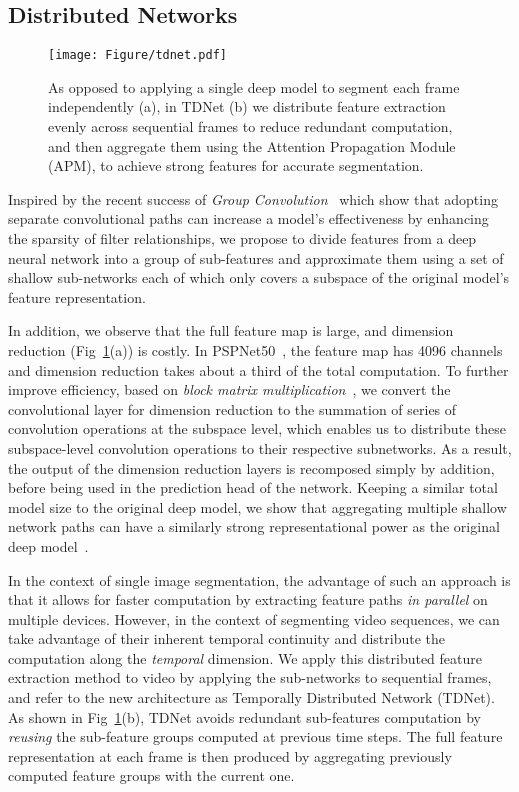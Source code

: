 \documentclass[10pt,twocolumn,letterpaper]{article}
\begin{document}
\subsection{Distributed Networks}
\label{sec_dn}

\begin{figure}
\centering
\texttt{[image: Figure/tdnet.pdf]}
\caption{As opposed to applying a single deep model to segment each frame independently (a), in TDNet (b) we distribute feature extraction evenly across sequential frames to reduce redundant computation, and then aggregate them using the Attention Propagation Module (APM), to achieve strong features for accurate segmentation.}
\label{fig2}
\vspace{-0.3cm}
\end{figure}

Inspired by the recent success of \textit{Group Convolution}~\cite{krizhevsky2012imagenet,ioannou2017deep} which show that adopting separate convolutional paths can increase a model's effectiveness by enhancing the sparsity of filter relationships, we propose to divide features from a deep neural network into a group of sub-features and approximate them using a set of shallow sub-networks each of which only covers a subspace of the original model's feature representation. 

In addition, we observe that the full feature map is large, and dimension reduction (Fig~\ref{fig2}(a)) is costly.
In PSPNet50~\cite{zhao2017pyramid}, the feature map has 4096 channels and dimension reduction takes about a third of the total computation. 
To further improve efficiency, based on \textit{block matrix multiplication}~\cite{eves1980elementary}, we convert the convolutional layer for dimension reduction to the summation of series of convolution operations at the subspace level, which enables us to distribute these subspace-level convolution operations to their respective subnetworks. 
As a result, the output of the dimension reduction layers is recomposed simply by addition, before being used in the prediction head of the network.
Keeping a similar total model size to the original deep model, we show that aggregating multiple shallow network paths can have a similarly strong representational power as the original deep model~\cite{wu2019wider,Zagoruyko2016WRN,szegedy2017inception,veit2016residual}.

In the context of single image segmentation, the advantage of such an approach is that it allows for faster computation by extracting feature paths \emph{in parallel} on multiple devices. 
However, in the context of segmenting video sequences, we can take advantage of their inherent temporal continuity and distribute the computation along the \emph{temporal} dimension. 
We apply this distributed feature extraction method to video by applying the sub-networks to sequential frames, and refer to the new architecture as Temporally Distributed Network (TDNet).
As shown in Fig~\ref{fig2}(b), TDNet avoids redundant sub-features computation by \emph{reusing} the sub-feature groups computed at previous time steps.
The full feature representation at each frame is then produced by aggregating previously computed feature groups with the current one. 
\end{document}
